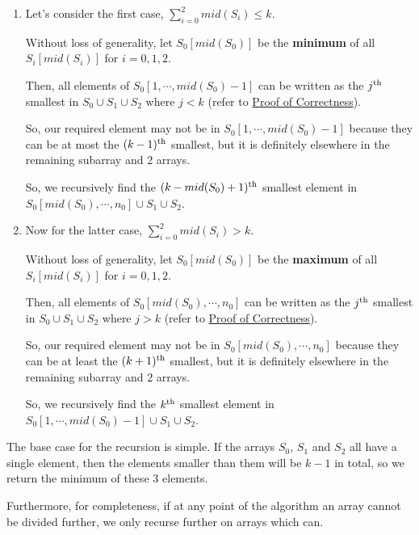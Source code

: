 \documentclass{article}
\begin{document}
\begin{enumerate}

\item Let's consider the first case, $\sum_{i=0}^{2} mid(S_i) \leq k$.

    Without loss of generality, let $S_0[mid(S_0)]$ be the \textbf{minimum} of all $S_i[mid(S_i)]$ for $i=0,1,2$.

        Then, all elements of $S_0[1, \cdots, mid(S_0) - 1]$ can be written as the $j\textsuperscript{th}$ smallest in $S_0 \cup S_1 \cup S_2$ where $j < k$ (refer to \hyperlink{section.7}{Proof of Correctness}).

        So, our required element may not be in $S_0[1, \cdots, mid(S_0) - 1]$ because they can be at most the $(k-1)\textsuperscript{th}$ smallest, but it is definitely elsewhere in the remaining subarray and 2 arrays.

        So, we recursively find the $(k - mid(S_0) + 1)\textsuperscript{th}$ smallest element in $S_0[mid(S_0), \cdots, n_0] \cup S_1 \cup S_2$.

\item Now for the latter case, $\sum_{i=0}^{2} mid(S_i) > k$.

    Without loss of generality, let $S_0[mid(S_0)]$ be the \textbf{maximum} of all $S_i[mid(S_i)]$ for $i=0,1,2$.

        Then, all elements of $S_0[mid(S_0), \cdots, n_0]$ can be written as the $j\textsuperscript{th}$ smallest in $S_0 \cup S_1 \cup S_2$ where $j > k$ (refer to \hyperlink{section.7}{Proof of Correctness}).

        So, our required element may not be in $S_0[mid(S_0), \cdots, n_0]$ because they can be at least the $(k+1)\textsuperscript{th}$ smallest, but it is definitely elsewhere in the remaining subarray and 2 arrays.

        So, we recursively find the $k\textsuperscript{th}$ smallest element in $S_0[1, \cdots, mid(S_0) - 1] \cup S_1 \cup S_2$.

\end{enumerate}

The base case for the recursion is simple. If the arrays $S_0$, $S_1$ and $S_2$ all have a single element, then the elements smaller than them will be $k-1$ in total, so we return the minimum of these 3 elements.

Furthermore, for completeness, if at any point of the algorithm an array cannot be divided further, we only recurse further on arrays which can.
\end{document}

